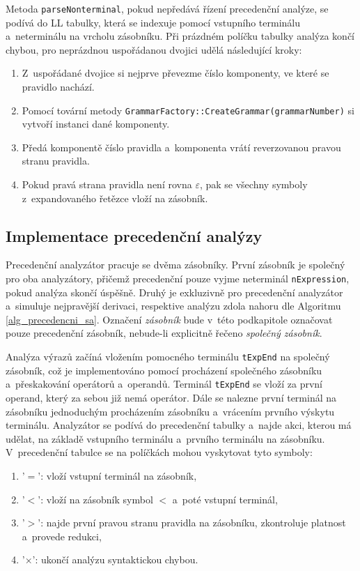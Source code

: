 Metoda \texttt{parseNonterminal}, pokud nepředává řízení precedenční analýze, se podívá do LL tabulky, která se indexuje pomocí vstupního terminálu a~neterminálu na vrcholu zásobníku.
Při prázdném políčku tabulky analýza končí chybou, pro neprázdnou uspořádanou dvojici udělá následující kroky:
\begin{enumerate}[label=\arabic*)]
    \item Z~uspořádané dvojice si nejprve převezme číslo komponenty, ve které se pravidlo nachází.
    \item Pomocí tovární metody \texttt{GrammarFactory::CreateGrammar(grammarNumber)} si vytvoří instanci dané komponenty.
    \item Předá komponentě číslo pravidla a~komponenta vrátí reverzovanou pravou stranu pravidla.
    \item Pokud pravá strana pravidla není rovna $\varepsilon$, pak se všechny symboly z~expandovaného řetězce vloží na zásobník.
\end{enumerate}

\subsection*{Implementace precedenční analýzy}
Precedenční analyzátor pracuje se dvěma zásobníky.
První zásobník je společný pro oba analyzátory, přičemž precedenční pouze vyjme neterminál \texttt{nExpression}, pokud analýza skončí úspěšně.
Druhý je exkluzivně pro precedenční analyzátor a~simuluje nejpravější derivaci, respektive analýzu zdola nahoru dle Algoritmu \ref{alg_precedencni_sa}.
Označení \emph{zásobník} bude v~této podkapitole označovat pouze precedenční zásobník, nebude-li explicitně řečeno \emph{společný zásobník}.

Analýza výrazů začíná vložením pomocného terminálu \texttt{tExpEnd} na společný zásobník, což je implementováno pomocí procházení společného zásobníku a~přeskakování operátorů a~operandů.
Terminál \texttt{tExpEnd} se vloží za první operand, který za sebou již nemá operátor.
Dále se nalezne první terminál na zásobníku jednoduchým procházením zásobníku a~vrácením prvního výskytu terminálu.
Analyzátor se podívá do precedenční tabulky a~najde akci, kterou má udělat, na základě vstupního terminálu a~prvního terminálu na zásobníku.
V~precedenční tabulce se na políčkách mohou vyskytovat tyto symboly:
\begin{enumerate}[label=\arabic*)]
    \item '$=$': vloží vstupní terminál na zásobník,
    \item '$<$': vloží na zásobník symbol $<$ a~poté vstupní terminál,
    \item '$>$': najde první pravou stranu pravidla na zásobníku, zkontroluje platnost a~provede redukci,
    \item '$\times$': ukončí analýzu syntaktickou chybou.
\end{enumerate}

